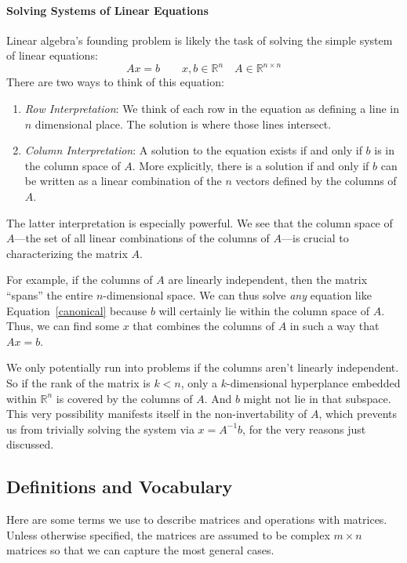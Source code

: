 \documentclass[12pt]{article}
\numberwithin{equation}{section} %
\theoremstyle{plain}
\theoremstyle{definition}
\theoremstyle{remark}
\newcommand{\Rn}{\mathbb{R}^n}
\newcommand{\Rnn}{\mathbb{R}^{n\times n}}
\begin{document}
\paragraph{Solving Systems of Linear Equations}
Linear algebra's founding problem is likely the task of solving the
simple system of linear equations:
\begin{equation}
    \label{canonical}
    Ax = b
    \qquad x,b\in \Rn
    \quad A \in \Rnn
\end{equation}
There are two ways to think of this equation:
\begin{enumerate}
  \item {\sl Row Interpretation}: We think of each row in the equation
    as defining a line in $n$ dimensional place. The solution is where
    those lines intersect.
  \item {\sl Column Interpretation}: A solution to the equation exists
    if and only if $b$ is in the column space of $A$. More explicitly,
    there is a solution if and only if $b$ can be written as a linear
    combination of the $n$ vectors defined by the columns of $A$.
\end{enumerate}
The latter interpretation is especially powerful. We see that the column
space of $A$---the set of all linear combinations of the columns of
$A$---is crucial to characterizing the matrix $A$.

For example, if the columns of $A$ are linearly independent, then the
matrix ``spans'' the entire $n$-dimensional space. We can thus solve
\emph{any} equation like Equation~\ref{canonical} because $b$ will
certainly lie within the column space of $A$. Thus, we can find some $x$
that combines the columns of $A$ in such a way that $Ax=b$.

We only potentially run into problems if the columns aren't linearly
independent. So if the rank of the matrix is $k<n$, only a
$k$-dimensional hyperplance embedded within $\mathbb{R}^n$ is covered by
the columns of $A$. And $b$ might not lie in that subspace. This very
possibility manifests itself in the non-invertability of $A$, which
prevents us from trivially solving the system via $x = A^{-1}b$, for the
very reasons just discussed.

\subsection{Definitions and Vocabulary}

Here are some terms we use to describe matrices and operations with
matrices. Unless otherwise specified, the matrices are assumed to be
complex $m\times n$ matrices so that we can capture the most general
cases.
\end{document}
